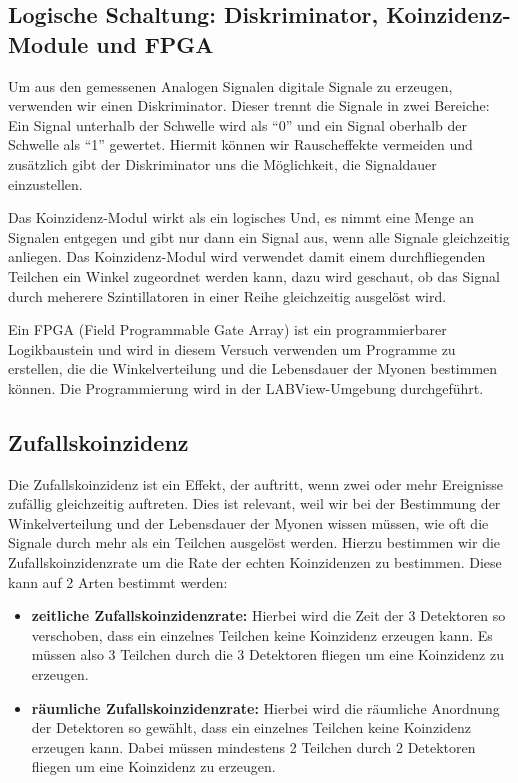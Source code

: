 \documentclass{article}
\begin{document}
\subsection{Logische Schaltung: Diskriminator, Koinzidenz-Module und FPGA}
Um aus den gemessenen Analogen Signalen digitale Signale zu erzeugen, verwenden wir einen Diskriminator. 
Dieser trennt die Signale in zwei Bereiche: Ein Signal unterhalb der Schwelle wird als \enquote{0} und ein Signal oberhalb der Schwelle als \enquote{1} gewertet. 
Hiermit können wir Rauscheffekte vermeiden und zusätzlich gibt der Diskriminator uns die Möglichkeit, die Signaldauer einzustellen.

Das Koinzidenz-Modul wirkt als ein logisches Und, es nimmt eine Menge an Signalen entgegen und gibt nur dann ein Signal aus, 
wenn alle Signale gleichzeitig anliegen. Das Koinzidenz-Modul wird verwendet damit einem durchfliegenden Teilchen ein Winkel zugeordnet werden kann, 
dazu wird geschaut, ob das Signal durch meherere Szintillatoren in einer Reihe gleichzeitig ausgelöst wird.

Ein FPGA (Field Programmable Gate Array) ist ein programmierbarer Logikbaustein und wird in diesem Versuch verwenden um Programme zu erstellen, die die Winkelverteilung
und die Lebensdauer der Myonen bestimmen können.
Die Programmierung wird in der LABView-Umgebung durchgeführt.
\subsection{Zufallskoinzidenz} 
Die Zufallskoinzidenz ist ein Effekt, der auftritt, wenn zwei oder mehr Ereignisse zufällig gleichzeitig auftreten. 
Dies ist relevant, weil wir bei der Bestimmung der Winkelverteilung und der Lebensdauer der Myonen wissen müssen, wie oft die Signale durch mehr als ein Teilchen
ausgelöst werden. Hierzu bestimmen wir die Zufallskoinzidenzrate um die Rate der echten Koinzidenzen zu bestimmen.
Diese kann auf 2 Arten bestimmt werden:
\begin{itemize}
    \item \textbf{zeitliche Zufallskoinzidenzrate:} Hierbei wird die Zeit der 3 Detektoren so verschoben, dass ein einzelnes Teilchen keine Koinzidenz erzeugen kann.
        Es müssen also 3 Teilchen durch die 3 Detektoren fliegen um eine Koinzidenz zu erzeugen.
    \item \textbf{räumliche Zufallskoinzidenzrate:} Hierbei wird die räumliche Anordnung der Detektoren so gewählt, dass ein einzelnes Teilchen keine Koinzidenz erzeugen kann.
        Dabei müssen mindestens 2 Teilchen durch 2 Detektoren fliegen um eine Koinzidenz zu erzeugen.
\end{itemize}   
\end{document}
